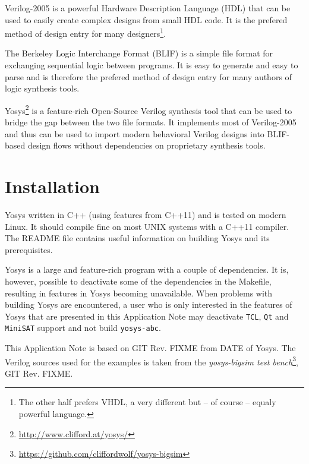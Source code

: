 

\begin{appnote_abstract}
Verilog-2005 is a powerful Hardware Description Language (HDL) that can be used
to easily create complex designs from small HDL code. It is the prefered
method of design entry for many designers\footnote{The other half prefers VHDL,
a very different but -- of course -- equaly powerful language.}.

The Berkeley Logic Interchange Format (BLIF) is a simple file format for
exchanging sequential logic between programs. It is easy to generate and
easy to parse and is therefore the prefered method of design entry for
many authors of logic synthesis tools.

Yosys\footnote{\url{http://www.clifford.at/yosys/}} is a feature-rich Open-Source Verilog synthesis tool that can be used to
bridge the gap between the two file formats. It implements most of Verilog-2005
and thus can be used to import modern behavioral Verilog designs into BLIF-based
design flows without dependencies on proprietary synthesis tools.
\end{appnote_abstract}

\section{Installation}

Yosys written in C++ (using features from C++11) and is tested on modern Linux.
It should compile fine on most UNIX systems with a C++11 compiler. The README
file contains useful information on building Yosys and its prerequisites.

Yosys is a large and feature-rich program with a couple of dependencies. It is,
however, possible to deactivate some of the dependencies in the Makefile,
resulting in features in Yosys becoming unavailable. When problems with building
Yosys are encountered, a user who is only interested in the features of Yosys
that are presented in this Application Note may deactivate {\tt TCL}, {\tt Qt}
and {\tt MiniSAT} support and not build {\tt yosys-abc}.

\bigskip

This Application Note is based on GIT Rev. {\color{red} FIXME} from
{\color{red} DATE} of Yosys. The Verilog sources used for the examples
is taken from the {\it yosys-bigsim test
bench}\footnote{\url{https://github.com/cliffordwolf/yosys-bigsim}}, GIT
Rev. {\color{red} FIXME}.

